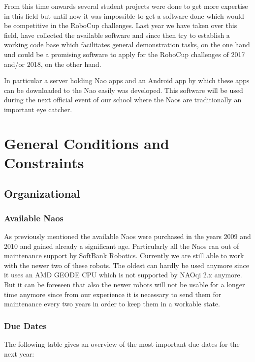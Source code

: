 \documentclass[12pt]{article}
\theoremstyle{definition}
\begin{document}
From this time onwards several student projects were done to get more expertise in this field but until now it was impossible to get a software done which would be competitive in the RoboCup challenges. Last year we have taken over this field, have collected the available software and since then try to establish a working code base which facilitates general demonstration tasks, on the one hand und could be a promising software to apply for the RoboCup challenges of 2017 and/or 2018, on the other hand.

In particular a server holding Nao apps and an Android app by which these apps can be downloaded to the Nao easily was developed. This software will be used during the next official event of our school where the Naos are traditionally an important eye catcher.
 
\section{General Conditions and Constraints}
\subsection{Organizational}
\subsubsection{Available Naos}
As previously mentioned the available Naos were purchased in the years 2009 and 2010 and gained already a significant age. Particularly all the Naos ran out of maintenance support by SoftBank Robotics. Currently we are still able to work with the newer two of these robots. The oldest can hardly be used anymore since it uses an AMD GEODE CPU which is not supported by NAOqi 2.x anymore\cite{inbar_new_2014}. But it can be foreseen that also the newer robots will not be usable for a longer time anymore since from our experience it is necessary to send them for maintenance every two years in order to keep them in a workable state.

\subsubsection{Due Dates}
The following table gives an overview of the most important due dates for the next year:
\end{document}
